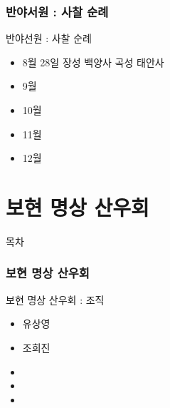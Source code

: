 \documentclass[aspectratio=1610,17pt,xcolor=pdftex,dvipsnames,table,handout]{beamer}
\begin{document}
		\section{반야서원 : 사찰 순례}

		\begin{frame} [t,plain]
			\begin{block} {반야선원 : 사찰 순례}
			\begin{itemize}
				\item 8월 28일 장성 백양사 곡성 태안사
				\item 9월
				\item 10월
				\item 11월
				\item 12월
			\end{itemize}
			\end{block}
		\end{frame}



		\part{보현 명상 산우회}
		\frame{\partpage}


		\begin{frame} [plain]{목차}
		\tableofcontents
		\end{frame}
		



		\section{보현 명상 산우회}

		\begin{frame} [t,plain]
			\begin{block} {보현 명상 산우회 : 조직}
			\begin{itemize}
				\item 유상영
				\item 조희진
				\item 
				\item 
				\item 
			\end{itemize}
			\end{block}
		\end{frame}
\end{document}

